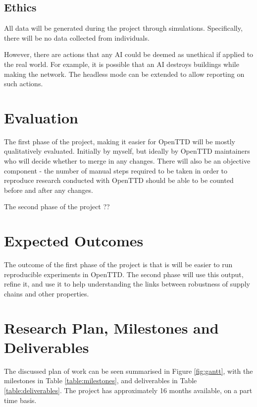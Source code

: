 \documentclass[a4paper,11pt]{article}
\begin{document}
\subsection{Ethics}

All data will be generated during the project through simulations. Specifically, there will be no data collected from individuals.

However, there are actions that any AI could be deemed as unethical if applied to the real world. For example, it is possible that an AI destroys buildings while making the network. The headless mode can be extended to allow reporting on such actions.

\section{Evaluation}

The first phase of the project, making it easier for OpenTTD will be mostly qualitatively evaluated. Initially by myself, but ideally by OpenTTD maintainers who will decide whether to merge in any changes. There will also be an objective component - the number of manual steps required to be taken in order to reproduce research conducted with OpenTTD should be able to be counted before and after any changes.

The second phase of the project ??

\section{Expected Outcomes}

The outcome of the first phase of the project is that is will be easier to run reproducible experiments in OpenTTD. The second phase will use this output, refine it, and use it to help understanding the links between robustness of supply chains and other properties.

\section{Research Plan, Milestones and Deliverables}

The discussed plan of work can be seen summarised in Figure \ref{fig:gantt}, with the milestones in Table \ref{table:milestones}, and deliverables in Table \ref{table:deliverables}. The project has approximately 16 months available, on a part time basis.
\end{document}
